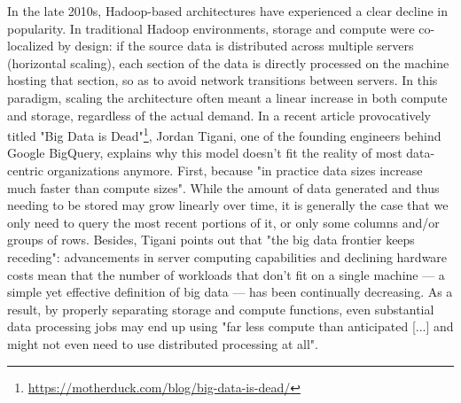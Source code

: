 \documentclass[graybox]{svmult}
\begin{document}
In the late 2010s, Hadoop-based architectures have experienced a clear decline in popularity. In traditional Hadoop environments, storage and compute were co-localized by design: if the source data is distributed across multiple servers (horizontal scaling), each section of the data is directly processed on the machine hosting that section, so as to avoid network transitions between servers. In this paradigm, scaling the architecture often meant a linear increase in both compute and storage, regardless of the actual demand. In a recent article provocatively titled "Big Data is Dead"\footnote{\url{https://motherduck.com/blog/big-data-is-dead/}}, Jordan Tigani, one of the founding engineers behind Google BigQuery, explains why this model doesn't fit the reality of most data-centric organizations anymore. First, because "in practice data sizes increase much faster than compute sizes". While the amount of data generated and thus needing to be stored may grow linearly over time, it is generally the case that we only need to query the most recent portions of it, or only some columns and/or groups of rows. Besides, Tigani points out that "the big data frontier keeps receding": advancements in server computing capabilities and declining hardware costs mean that the number of workloads that don't fit on a single machine — a simple yet effective definition of big data — has been continually decreasing. As a result, by properly separating storage and compute functions, even substantial data processing jobs may end up using "far less compute than anticipated [...] and might not even need to use distributed processing at all".
\end{document}
